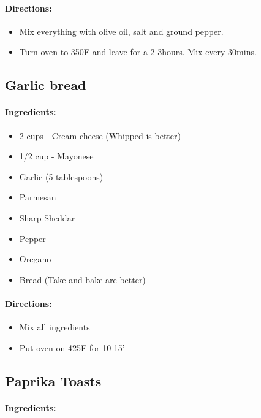 \documentclass{article}
\begin{document}
\paragraph{Directions:}
\begin{itemize}
	\item Mix everything with olive oil, salt and ground pepper.
	\item Turn oven to 350F and leave for a 2-3hours. Mix every 30mins.
\end{itemize}

\subsection{Garlic bread}

\paragraph{Ingredients:}

\begin{itemize}
	\item 2 cups - Cream cheese (Whipped is better)
	\item 1/2 cup - Mayonese 
	\item Garlic (5 tablespoons)
	\item Parmesan
	\item Sharp Sheddar
	\item Pepper
	\item Oregano
	\item Bread (Take and bake are better)
\end{itemize}

\paragraph{Directions:}
\begin{itemize}
	\item Mix all ingredients
	\item Put oven on 425F for 10-15'
\end{itemize}

\subsection{Paprika Toasts}

\paragraph{Ingredients:}
\end{document}
